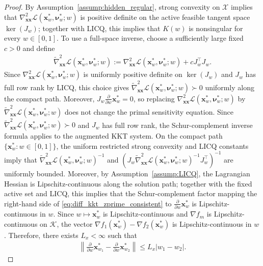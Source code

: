 \documentclass{article}
\newcommand{\bx}{\mathbf{x}}
\newcommand{\X}{\mathcal{X}}
\begin{document}
\begin{proof}
By Assumption~\ref{assump:hidden_regular}, strong convexity on $\X$ implies that $\nabla_{\bx\bx}^2\mathcal L(\bx_w^*,\boldsymbol{\nu}_w^*;w)$ is positive definite on the active feasible tangent space $\ker(J_w)$; together with LICQ, this implies that $K(w)$ is nonsingular for every $w\in[0,1]$.
To use a full-space inverse, choose a sufficiently large fixed $c>0$ and define
\begin{align}
\widetilde \nabla_{\bx\bx}^2\mathcal L(\bx_w^*,\boldsymbol{\nu}_w^*;w):=\nabla_{\bx\bx}^2\mathcal L(\bx_w^*,\boldsymbol{\nu}_w^*;w)+cJ_w^\top J_w.
\end{align}
Since $\nabla_{\bx\bx}^2\mathcal L(\bx_w^*,\boldsymbol{\nu}_w^*;w)$ is uniformly positive definite on $\ker(J_w)$ and $J_w$ has full row rank by LICQ, this choice gives $\widetilde \nabla_{\bx\bx}^2\mathcal L(\bx_w^*,\boldsymbol{\nu}_w^*;w)\succ0$ uniformly along the compact path.
Moreover, $J_w\frac{\partial}{\partial w}\bx_w^*=0$, so replacing $\nabla_{\bx\bx}^2\mathcal L(\bx_w^*,\boldsymbol{\nu}_w^*;w)$ by $\widetilde \nabla_{\bx\bx}^2\mathcal L(\bx_w^*,\boldsymbol{\nu}_w^*;w)$ does not change the primal sensitivity equation.
Since $\widetilde \nabla_{\bx\bx}^2\mathcal L(\bx_w^*,\boldsymbol{\nu}_w^*;w)\succ0$ and $J_w$ has full row rank, the Schur-complement inverse formula applies to the augmented KKT system. On the compact path $\{\bx^*_w:w\in[0,1]\}$, the uniform restricted strong convexity and LICQ constants imply that $\widetilde \nabla_{\bx\bx}^2\mathcal L(\bx_w^*,\boldsymbol{\nu}_w^*;w)^{-1}$ and $\left(J_w\widetilde \nabla_{\bx\bx}^2\mathcal L(\bx_w^*,\boldsymbol{\nu}_w^*;w)^{-1}J_w^\top\right)^{-1}$ are uniformly bounded.
Moreover, by Assumption~\ref{assump:LICQ}, the Lagrangian Hessian is Lipschitz-continuous along the solution path; together with the fixed active set and LICQ, this implies that the Schur-complement factor mapping the right-hand side of \eqref{eq:diff_kkt_zprime_consistent} to $\frac{\partial}{\partial w}\bx_w^*$ is Lipschitz-continuous in $w$.
Since $w\mapsto\bx_w^*$ is Lipschitz-continuous and $\nabla f_m$ is Lipschitz-continuous on $\mathcal K$, the vector $\nabla f_1(\bx_w^*)-\nabla f_2(\bx_w^*)$ is Lipschitz-continuous in $w$.
Therefore, there exists $L_x<\infty$ such that
\begin{align}
\left\|\frac{\partial}{\partial w}\bx_{w_1}^*-\frac{\partial}{\partial w}\bx_{w_2}^*\right\|\le L_x|w_1-w_2|.
\label{eq:xprime_Lipschitz_consistent}
\end{align}


\end{proof}
\end{document}

